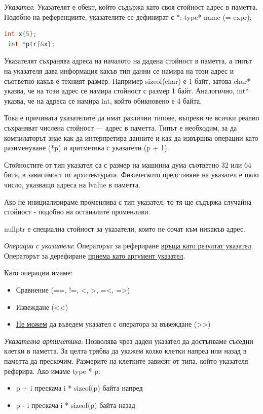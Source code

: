 \documentclass{article}
\renewcommand{\\}{\newline}
\begin{document}
\textit{Указател}: Указателят е обект, който съдържа като своя стойност адрес в паметта. Подобно на референциите, указателите се дефинират с *: type* name (= expr);

\begin{lstlisting}[language=C++]
 int x{5};
 int *ptr{&x};
\end{lstlisting}

Указателят съхранява адреса на началото на дадена стойност в паметта, а типът на указателя дава информация какъв тип данни се намира на този адрес и съответно какъв е техният размер. Например sizeof(char) е 1 байт, затова char* указва, че на този адрес се намира стойност с размер 1 байт. Аналогично, int* указва, че на адреса се намира int, който обикновено е 4 байта.

Това е причината указателите да имат различни типове, въпреки че всички реално съхраняват числена стойност — адрес в паметта. Типът е необходим, за да компилаторът знае как да интерпретира данните и как да извършва операции като разименуване (*p) и аритметика с указатели (p + 1).

Стойностите от тип указател са с размер на машинна дума съответно 32 или 64 бита, в зависимост от архитектурата. Физическото представяне на указател е цяло число, указващо адреса на lvalue в паметта. 

Ако не инициализираме променлива с тип указател, то тя ще съдържа случайна стойност - подобно на останалите променливи.

nullptr е специална стойност за указатели, които не сочат към никакъв адрес. 

\textit{Операции с указатели}: Операторът за рефериране \underline{връща като резултат указател}. Операторът за дерефиране \underline{приема като аргумент указател}.

Като операции имаме:
\begin{itemize}
    \item Сравнение (==, !=, <, >, =<, =>)
    \item Извеждане (<<)
    \item \underline{Не можем} да въведем указател с оператора за въвеждане (>>)
\end{itemize}

\textit{Указателна артиметика}: Позволява чрез даден указател да достъпваме съседни клетки в паметта. За целта трябва да укажем колко клетки напред или назад в паметта да прескочим. Размерите на клетките зависят от типа, който указателя реферира. Ако имаме type * p:
\begin{itemize}
    \item p + i прескача i * sizeof(p) байта напред  
    \item p - i прескача i * sizeof(p) байта назад  
\end{itemize}
\end{document}
